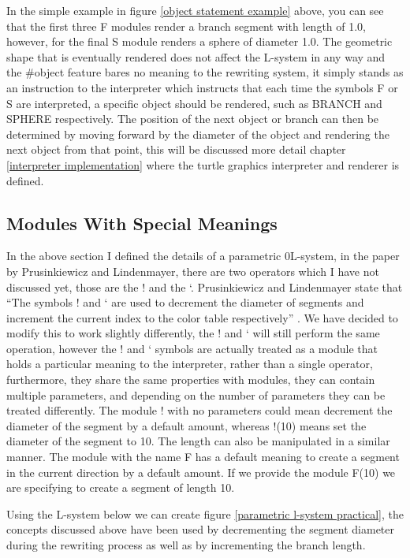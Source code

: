 \noindent
In the simple example in figure \ref{object statement example} above, you can see that the first three F modules render a branch segment with length of 1.0, however, for the final S module renders a sphere of diameter 1.0. The geometric shape that is eventually rendered does not affect the L-system in any way and the \#object feature bares no meaning to the rewriting system, it simply stands as an instruction to the interpreter which instructs that each time the symbols F or S are interpreted, a specific object should be rendered, such as BRANCH and SPHERE respectively. The position of the next object or branch can then be determined by moving forward by the diameter of the object and rendering the next object from that point, this will be discussed more detail chapter \ref{interpreter implementation} where the turtle graphics interpreter and renderer is defined.

\subsection{Modules With Special Meanings}

In the above section I defined the details of a parametric 0L-system, in the paper by Prusinkiewicz and Lindenmayer, there are two operators which I have not discussed yet, those are the ! and the ‘. Prusinkiewicz and Lindenmayer state that “The symbols ! and ‘ are used to decrement the diameter of segments and increment the current index to the color table respectively” \cite{prusinkiewicz2012algorithmic}. We have decided to modify this to work slightly differently, the ! and ‘ will still perform the same operation, however the ! and ‘ symbols are actually treated as a module that holds a particular meaning to the interpreter, rather than a single operator, furthermore, they share the same properties with modules, they can contain multiple parameters, and depending on the number of parameters they can be treated differently. The module ! with no parameters could mean decrement the diameter of the segment by a default amount, whereas !(10) means set the diameter of the segment to 10. The length can also be manipulated in a similar manner. The module with the name F has a default meaning to create a segment in the current direction by a default amount. If we provide the module F(10) we are specifying to create a segment of length 10.

Using the L-system below we can create figure \ref{parametric l-system practical}, the concepts discussed above have been used by decrementing the segment diameter during the rewriting process as well as by incrementing the branch length.

